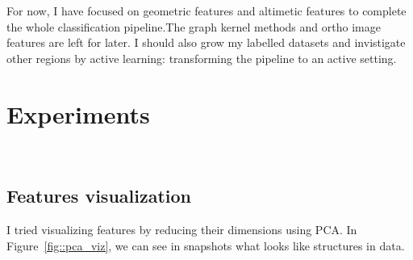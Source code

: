 \documentclass[a4paper, 11pt]{article}
\begin{document}
	For now, I have focused on geometric features and altimetic features to complete the whole classification pipeline.The graph kernel methods and ortho image features are left for later. I should also grow my labelled datasets and invistigate other regions by active learning: transforming the pipeline to an active setting.

	\section{Experiments}
~\\
	\subsection{Features visualization}

	I tried visualizing features by reducing their dimensions using PCA. In Figure~\ref{fig::pca_viz}, we can see in snapshots what looks like structures in data.
\end{document}
